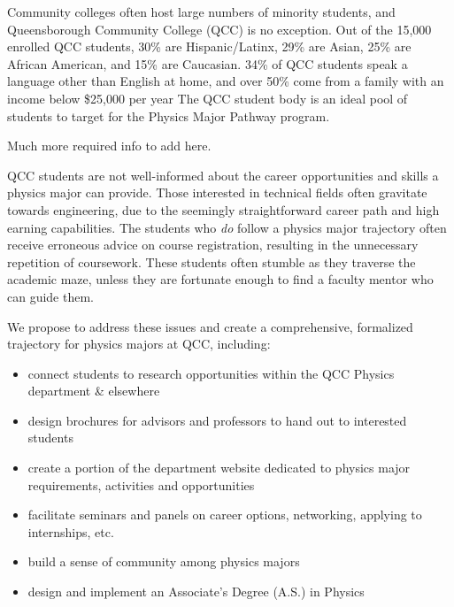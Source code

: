 \documentclass[12pt]{article}
\begin{document}
Community colleges often host large numbers of minority students, and Queensborough Community College (QCC) is no exception.  Out of the 15,000 enrolled QCC students, 30\% are Hispanic/Latinx, 29\% are Asian, 25\% are African American, and 15\% are Caucasian.  34\% of QCC students speak a language other than English at home, and over 50\% come from a family with an income below \$25,000 per year \citep{QCCweb} The QCC student body is an ideal pool of students to target for the Physics Major Pathway program.


Much more required info to add here.




QCC students are not well-informed about the career opportunities and skills a physics major can provide.  Those interested in technical fields often gravitate towards engineering, due to the seemingly straightforward career path and high earning capabilities.  The students who {\em do} follow a physics major trajectory often receive erroneous advice on course registration, resulting in the unnecessary repetition of coursework.  These students often stumble as they traverse the academic maze, unless they are fortunate enough to find a faculty mentor who can guide them.

We propose to address these issues and create a comprehensive, formalized trajectory for physics majors at QCC, including:
\vspace{-2mm}

\begin{itemize}
\setlength{\itemsep}{-\parsep}
\setlength{\topsep}{-\parsep}
\setlength{\partopsep}{-\parsep}
	\item connect students to research opportunities within the QCC Physics department \& elsewhere
	\item design brochures for advisors and professors to hand out to interested students
	\item create a portion of the department website dedicated to physics major requirements, activities and opportunities
	\item facilitate seminars and panels on career options, networking, applying to internships, etc.
	\item build a sense of community among physics majors 
	\item design and implement an Associate's Degree (A.S.) in Physics
\end{itemize}	
	
\end{document}
